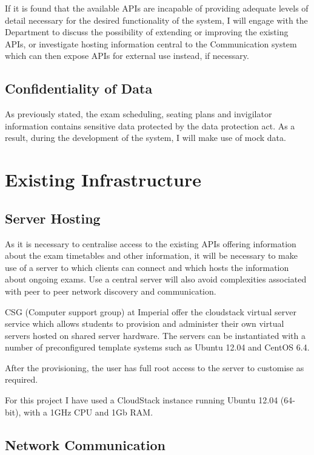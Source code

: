 If it is found that the available APIs are incapable of providing adequate levels of detail necessary for the desired functionality of the system, I will engage with the Department to discuss the possibility of extending or improving the existing APIs, or investigate hosting information central to the Communication system which can then expose APIs for external use instead, if necessary.

\subsection{Confidentiality of Data}

As previously stated, the exam scheduling, seating plans and invigilator information contains sensitive data protected by the data protection act.  As a result, during the development of the system, I will make use of mock data.

\section{Existing Infrastructure}

\subsection{Server Hosting}
As it is necessary to centralise access to the existing APIs offering information about the exam timetables and other information, it will be necessary to make use of a server to which clients can connect and which hosts the information about ongoing exams.  Use a central server will also avoid complexities associated with peer to peer network discovery and communication.

CSG (Computer support group) at Imperial offer the cloudstack virtual server service which allows students to provision and administer their own virtual servers hosted on shared server hardware. The servers can be instantiated with a number of preconfigured template systems such as Ubuntu 12.04 and CentOS 6.4.

After the provisioning, the user has full root access to the server to customise as required.

For this project I have used a CloudStack instance running Ubuntu 12.04 (64-bit), with a 1GHz CPU and 1Gb RAM.

\subsection{Network Communication}


